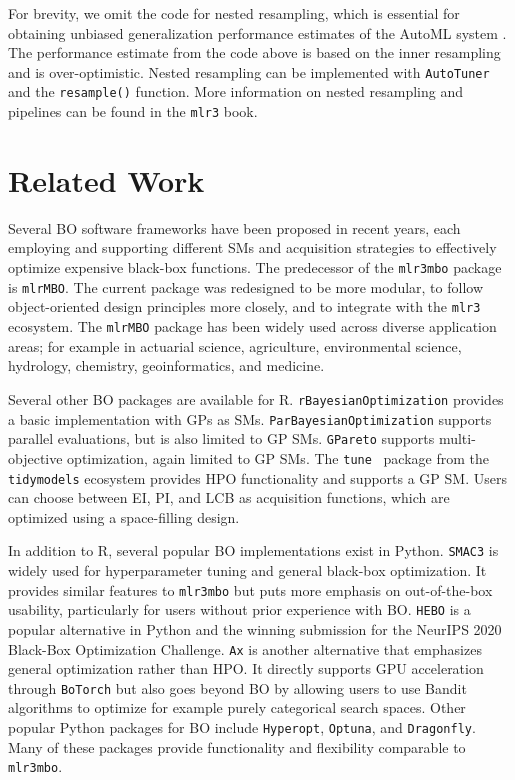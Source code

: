 \documentclass[12pt,letterpaper]{article}
\begin{document}
For brevity, we omit the code for nested resampling, which is essential for obtaining unbiased generalization performance estimates of the AutoML system \cite{bischl2023}.
The performance estimate from the code above is based on the inner resampling and is over-optimistic.
Nested resampling can be implemented with \texttt{AutoTuner} and the \texttt{resample()} function.
More information on nested resampling and pipelines can be found in the \texttt{mlr3} book\cite{bischl2024}.

\section{Related Work}
\label{sec:related-work}

Several BO software frameworks have been proposed in recent years, each employing and supporting different SMs and acquisition strategies to effectively optimize expensive black-box functions.
The predecessor of the \texttt{mlr3mbo} package is \texttt{mlrMBO}\cite{bischl2018}. 
The current package was redesigned to be more modular, to follow object-oriented design principles more closely, and to integrate with the \texttt{mlr3} ecosystem\cite{lang2019}.
The \texttt{mlrMBO} package has been widely used across diverse application areas; for example in actuarial science\cite{chen2023}, agriculture\cite{roscher-ehrig2024}, environmental science\cite{hough2020}, hydrology\cite{yang2021}, chemistry\cite{rodriguez-perez2020,yong2025}, geoinformatics\cite{merghadi2018}, and medicine\cite{smirniotis2024,ianevski2019,browaeys2020}.

Several other BO packages are available for R.
\texttt{rBayesianOptimization}\cite{yan2016} provides a basic implementation with GPs as SMs.
\texttt{ParBayesianOptimization}\cite{wilson2018} supports parallel evaluations, but is also limited to GP SMs. 
\texttt{GPareto}\cite{binois2019} supports multi-objective optimization, again limited to GP SMs.
The \texttt{tune}~\cite{kuhn2025} package from the \texttt{tidymodels} ecosystem provides HPO functionality and supports a GP SM.
Users can choose between EI, PI, and LCB as acquisition functions, which are optimized using a space-filling design.

In addition to R, several popular BO implementations exist in Python.
\texttt{SMAC3} \cite{lindauer2022} is widely used for hyperparameter tuning and general black-box optimization.
It provides similar features to \texttt{mlr3mbo} but puts more emphasis on out-of-the-box usability, particularly for users without prior experience with BO.
\texttt{HEBO} \cite{cowen-rivers2022} is a popular alternative in Python and the winning submission for the NeurIPS 2020 Black-Box Optimization Challenge.
\texttt{Ax} is another alternative that emphasizes general optimization rather than HPO. 
It directly supports GPU acceleration through \texttt{BoTorch} but also goes beyond BO by allowing users to use Bandit algorithms to optimize for example purely categorical search spaces.
Other popular Python packages for BO include \texttt{Hyperopt}\cite{bergstra2011}, \texttt{Optuna}\cite{akiba2019}, and \texttt{Dragonfly}\cite{kandasamy2020}.
Many of these packages provide functionality and flexibility comparable to \texttt{mlr3mbo}.
\end{document}
